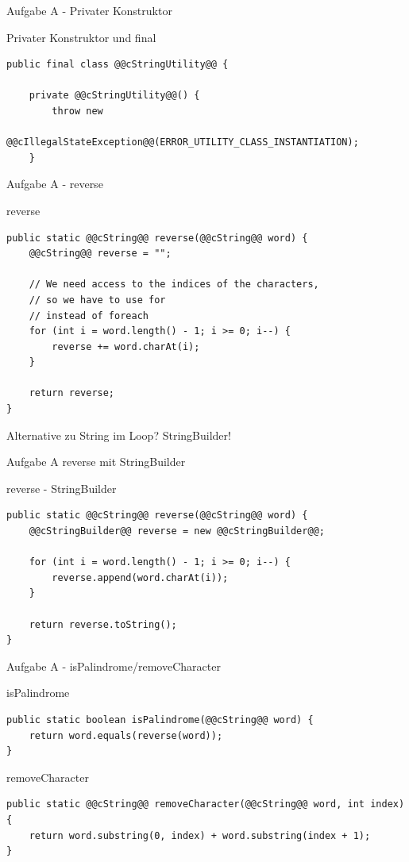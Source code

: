 \documentclass[aspectratio=169]{beamer}
\begin{document}
\begin{frame}[fragile]{Aufgabe A - Privater Konstruktor}
  \begin{alertblock}{Privater Konstruktor und \color{keywordcolor}final}
    \begin{lstlisting}
public final class @@cStringUtility@@ {

    private @@cStringUtility@@() {
        throw new
            @@cIllegalStateException@@(ERROR_UTILITY_CLASS_INSTANTIATION);
    }
    \end{lstlisting}
  \end{alertblock}
\end{frame}

\begin{frame}[fragile]{Aufgabe A - reverse}
  \begin{block}{reverse}
    \begin{lstlisting}
public static @@cString@@ reverse(@@cString@@ word) {
    @@cString@@ reverse = "";

    // We need access to the indices of the characters,
    // so we have to use for
    // instead of foreach
    for (int i = word.length() - 1; i >= 0; i--) {
        reverse += word.charAt(i);
    }

    return reverse;
}
    \end{lstlisting}
  \end{block}
  \pause
  Alternative zu \color{classcolor}String \color{FGround} im Loop? \pause \color{classcolor}StringBuilder\color{FGround}!
\end{frame}

\begin{frame}[fragile]{Aufgabe A reverse mit StringBuilder}
  \begin{exampleblock}{reverse - StringBuilder}
    \begin{lstlisting}
public static @@cString@@ reverse(@@cString@@ word) {
    @@cStringBuilder@@ reverse = new @@cStringBuilder@@;

    for (int i = word.length() - 1; i >= 0; i--) {
        reverse.append(word.charAt(i));
    }

    return reverse.toString();
}
    \end{lstlisting}
  \end{exampleblock}
\end{frame}


\begin{frame}[fragile]{Aufgabe A - isPalindrome/removeCharacter}
  \begin{block}{isPalindrome}
    \begin{lstlisting}
public static boolean isPalindrome(@@cString@@ word) {
    return word.equals(reverse(word));
}
    \end{lstlisting}
  \end{block}
  \pause
  \begin{block}{removeCharacter}
    \begin{lstlisting}
public static @@cString@@ removeCharacter(@@cString@@ word, int index) {
    return word.substring(0, index) + word.substring(index + 1);
}
    \end{lstlisting}
  \end{block}
\end{frame}
\end{document}
